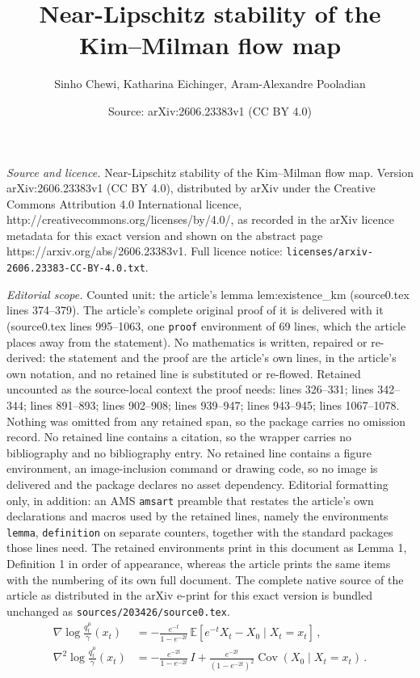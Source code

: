 \documentclass[10pt,a4paper]{amsart}
\title{Near-Lipschitz stability of the Kim--Milman flow map}
\author{Sinho Chewi, Katharina Eichinger, Aram-Alexandre Pooladian}
\date{Source: arXiv:2606.23383v1 (CC BY 4.0)}
\DeclareMathOperator{\Cov}{Cov}
\newcommand{\E}{\mathbb{E}}
\begin{document}
\maketitle

\noindent\emph{Source and licence.} Near-Lipschitz stability of the Kim--Milman flow map. Version arXiv:2606.23383v1 (CC BY 4.0), distributed by arXiv under the Creative Commons Attribution 4.0 International licence, http://creativecommons.org/licenses/by/4.0/, as recorded in the arXiv licence metadata for this exact version and shown on the abstract page https://arxiv.org/abs/2606.23383v1. Full licence notice: \texttt{licenses/arxiv-2606.23383-CC-BY-4.0.txt}.\par\smallskip

\noindent\textit{Editorial scope.} Counted unit: the article's lemma lem:existence\_km (source0.tex lines 374--379). The article's complete original proof of it is delivered with it (source0.tex lines 995--1063, one \texttt{proof} environment of 69 lines, which the article places away from the statement). No mathematics is written, repaired or re-derived: the statement and the proof are the article's own lines, in the article's own notation, and no retained line is substituted or re-flowed.  Retained uncounted as the source-local context the proof needs: lines 326--331; lines 342--344; lines 891--893; lines 902--908; lines 939--947; lines 943--945; lines 1067--1078.  Nothing was omitted from any retained span, so the package carries no omission record.  No retained line contains a citation, so the wrapper carries no bibliography and no bibliography entry.  No retained line contains a figure environment, an image-inclusion command or drawing code, so no image is delivered and the package declares no asset dependency.  Editorial formatting only, in addition: an AMS \texttt{amsart} preamble that restates the article's own declarations and macros used by the retained lines, namely the environments \texttt{lemma}, \texttt{definition} on separate counters, together with the standard packages those lines need.  The retained environments print in this document as Lemma 1, Definition 1 in order of appearance, whereas the article prints the same items with the numbering of its own full document.  The complete native source of the article as distributed in the arXiv e-print for this exact version is bundled unchanged as \texttt{sources/203426/source0.tex}.
    \begin{align}
        \nabla \log \frac{q_t^\mu}{\gamma}(x_t)
        &= -\frac{e^{-t}}{1-e^{-2t}}\, \E[e^{-t} X_t - X_0 \mid X_t = x_t]\,,\label{eq:tweedie_one} \\[0.25em]
        \nabla^2 \log \frac{q_t^{\mu}}{\gamma}(x_t)
        &= -\frac{e^{-2t}}{1-e^{-2t}}\,I + \frac{e^{-2t}}{(1-e^{-2t})^2} \Cov(X_0 \mid X_t=x_t)\,.\label{eq:tweedie_two}
    \end{align}
\end{document}
